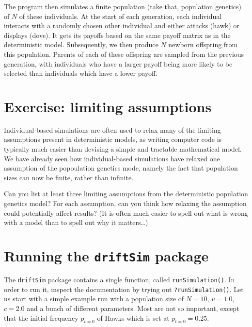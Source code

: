 \documentclass[
]{book}
\begin{document}
The program then simulates a finite population (take that, population genetics) of \(N\) of these individuals. At the start of each generation, each individual interacts with a randomly chosen other individual and either attacks (hawk) or displays (dove). It gets its payoffs based on the same payoff matrix as in the deterministic model. Subsequently, we then produce \(N\) newborn offspring from this population. Parents of each of these offspring are sampled from the previous generation, with individuals who have a larger payoff being more likely to be selected than individuals which have a lower payoff.

\hypertarget{exercise-limiting-assumptions}{%
\section{Exercise: limiting assumptions}\label{exercise-limiting-assumptions}}

Individual-based simulations are often used to relax many of the limiting assumptions present in deterministic models, as writing computer code is typically much easier than devising a simple and tractable mathematical model. We have already seen how individual-based simulations have relaxed one assumption of the popoulation genetics mode, namely the fact that population sizes can now be finite, rather than infinite.

Can you list at least three limiting assumptions from the deterministic population genetics model? For each assumption, can you think how relaxing the assumption could potentially affect results? (It is often much easier to spell out what is wrong with a model than to spell out why it matters\ldots)

\hypertarget{running-the-driftsim-package}{%
\section{\texorpdfstring{Running the \texttt{driftSim} package}{Running the driftSim package}}\label{running-the-driftsim-package}}

The \texttt{driftSim} package contains a single function, called \texttt{runSimulation()}. In order to run it, inspect the documentation by trying out \texttt{?runSimulation()}. Let us start with a simple example run with a population size of \(N=10\), \(v=1.0\), \(c=2.0\) and a bunch of different parameters. Most are not so important, except that the initial frequency \(p_{t=0}\) of Hawks which is set at \(p_{t=0} = 0.25\).
\end{document}
